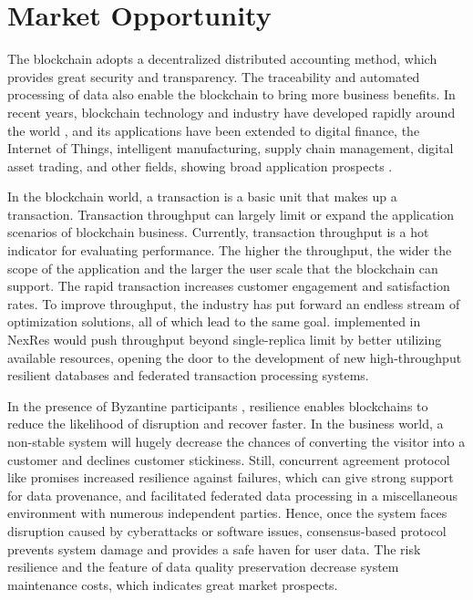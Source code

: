 \section{Market Opportunity}
\par The blockchain adopts a decentralized distributed accounting method, which provides great security 
and transparency. The traceability and automated processing of data also enable the blockchain to 
bring more business benefits. In recent years, blockchain technology and industry have developed 
rapidly around the world \cite{bitcoin, ethereum, hotstuff}, and its applications have been extended 
to digital finance, the Internet of Things, intelligent manufacturing, supply chain management, digital 
asset trading, and other fields, showing broad application prospects \cite{gupta2021fault}.

\par In the blockchain world, a transaction is a basic unit that makes up a transaction. Transaction 
throughput can largely limit or expand the application scenarios of blockchain business. Currently, 
transaction throughput is a hot indicator for evaluating performance. The higher the throughput, 
the wider the scope of the application and the larger the user scale that the blockchain can support. 
The rapid transaction increases customer engagement and satisfaction rates. To improve throughput, 
the industry has put forward an endless stream of optimization solutions, all of which lead to the same 
goal. \RCC{} \cite{rcc} implemented in NexRes would push throughput beyond single-replica limit by better 
utilizing available resources, opening the door to the development of new high-throughput resilient 
databases and federated transaction processing systems.

\par In the presence of Byzantine participants \cite{lao2020survey}, resilience enables blockchains to 
reduce the likelihood of disruption and recover faster. In the business 
world, a non-stable system will hugely decrease the chances of converting the visitor into a customer 
and declines customer stickiness. Still, concurrent agreement protocol like \RCC{} promises increased 
resilience against failures, which can give strong support for data provenance, and facilitated federated 
data processing in a miscellaneous environment with numerous independent parties. Hence, once the system 
faces disruption caused by cyberattacks or software issues, consensus-based protocol prevents system damage 
and provides a safe haven for user data. The risk resilience and the feature of data quality preservation 
decrease system maintenance costs, which indicates great market prospects.
